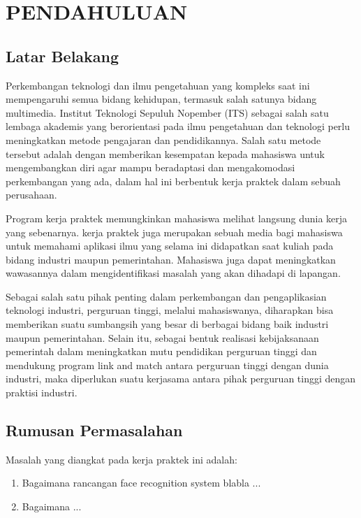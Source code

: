 \chapter{PENDAHULUAN}


\section{Latar Belakang}

  Perkembangan teknologi dan ilmu pengetahuan yang kompleks saat ini mempengaruhi semua bidang kehidupan, termasuk salah satunya bidang multimedia. Institut Teknologi Sepuluh Nopember (ITS) sebagai salah satu lembaga akademis yang berorientasi pada ilmu pengetahuan dan teknologi perlu meningkatkan metode pengajaran dan pendidikannya. Salah satu metode tersebut adalah dengan memberikan kesempatan kepada mahasiswa untuk mengembangkan diri agar mampu beradaptasi dan mengakomodasi perkembangan yang ada, dalam hal ini berbentuk kerja praktek dalam sebuah perusahaan.
  
  Program kerja praktek memungkinkan mahasiswa melihat langsung dunia kerja yang sebenarnya. kerja praktek juga merupakan sebuah media bagi mahasiswa untuk memahami aplikasi ilmu yang selama ini didapatkan saat kuliah pada bidang industri maupun pemerintahan. Mahasiswa juga dapat meningkatkan wawasannya dalam mengidentifikasi masalah yang akan dihadapi di lapangan.

  
  Sebagai salah satu pihak penting dalam perkembangan dan pengaplikasian teknologi industri, perguruan tinggi, melalui mahasiswanya, diharapkan bisa memberikan suatu sumbangsih yang besar di berbagai bidang baik industri maupun pemerintahan. Selain itu, sebagai bentuk realisasi kebijaksanaan pemerintah dalam meningkatkan mutu pendidikan perguruan tinggi dan mendukung program link and match antara perguruan tinggi dengan dunia industri, maka diperlukan suatu kerjasama antara pihak perguruan tinggi dengan praktisi industri.


\section{Rumusan Permasalahan}

Masalah yang diangkat pada kerja praktek ini adalah:

\begin{enumerate}[nolistsep]

  \item Bagaimana rancangan face recognition system blabla ...

  \item Bagaimana ...

\end{enumerate}

